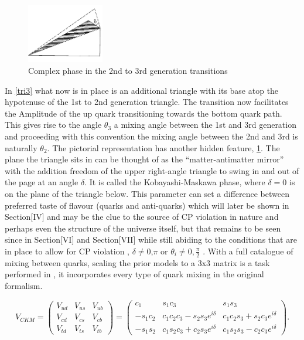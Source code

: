 \begin{figure}[h]
\includegraphics[angle=1.1,width=0.3\textwidth]{figs/ckmfig4b.jpg}
\caption{Complex phase in the 2nd to 3rd generation transitions}
\label{tri4}
\end{figure}

In \cref{tri3} what now is in place is an additional triangle with its base atop the hypotenuse of the 1st to 2nd generation triangle. The transition now facilitates the Amplitude of the up quark transitioning towards the bottom quark path. This gives rise to the angle $\theta_3$ a mixing angle between the 1st and 3rd generation and proceeding with this convention the mixing angle between the 2nd and 3rd is naturally $\theta_2$. The pictorial representation has another hidden feature, \cref{tri4}. The plane the triangle sits in can be thought of as the ``matter-antimatter mirror'' with the addition freedom of the upper right-angle triangle to swing in and out of the page at an angle $\delta$. It is called the Kobayashi-Maskawa phase, where $\delta=0$ is on the plane of the triangle below. This parameter can set a difference between preferred taste of flavour (quarks and anti-quarks) which will later be shown in Section[IV] and may be the clue to the source of CP violation in nature and perhaps even the structure of the universe itself, but that remains to be seen since in Section[VI] and Section[VII] while still abiding to the conditions that are in place to allow for CP violation , $\delta\neq0$,$\pi$ or $\theta_i\neq0,\frac{\pi}{2}$  \cite{CKM4} .
With a full catalogue of mixing between quarks, scaling the prior models to a 3x3 matrix is a task performed in \cite{CKM3} , it incorporates every type of quark mixing in the original formalism. 

\begin{equation}\label{ckm1}
V_{CKM} = \left( \begin{array}{ccc} V_{ud} & V_{us} & V_{ub} \\ V_{cd} & V_{cs} & V_{cb} \\ V_{td} & V_{ts} & V_{tb} \end{array}\right) = \left( \begin{array}{ccc} c_1 & s_1 c_3 & s_1 s_3 \\ -s_1 c_2 & c_1 c_2 c_3 -s_2 s_3 e^{i\delta} & c_1 c_2 s_3 + s_2 c_3 e^{i\delta} \\ -s_1 s_2 & c_1 s_2 c_3 +c_2 s_3 e^{i\delta} & c_1 s_2 s_3 - c_2 c_3 e^{i\delta} \end{array} \right). 
\end{equation}


